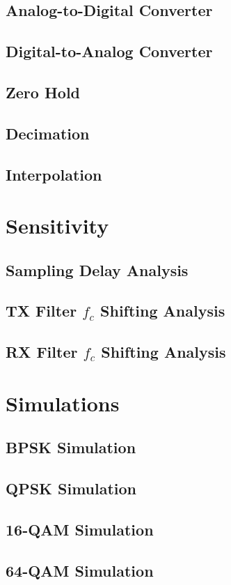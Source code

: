 \documentclass[]{article}
\begin{document}
\subsection{Analog-to-Digital Converter}
\label{app:ad}

\subsection{Digital-to-Analog Converter}
\label{app:da}


\subsection{Zero Hold}
\label{app:zero}
\subsection{Decimation}

\subsection{Interpolation}


\section{Sensitivity}
\label{app:sensitivity}

\subsection{Sampling Delay Analysis}
\label{app:delay}


\subsection{TX Filter $f_c$ Shifting Analysis}
\label{app:freqTX}


\subsection{RX Filter $f_c$ Shifting Analysis}
\label{app:freqRX}


\section{Simulations}
\subsection{BPSK Simulation}


\subsection{QPSK Simulation}


\subsection{16-QAM Simulation}


\subsection{64-QAM Simulation}

\end{document}

